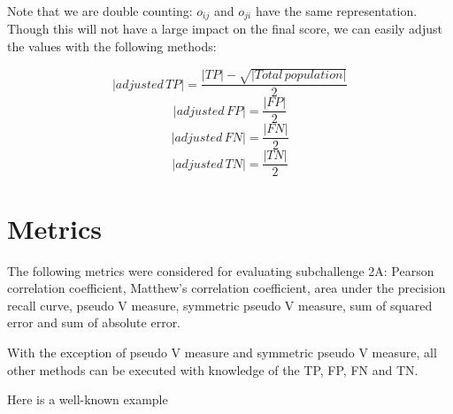 \documentclass[a4paper, 11pt]{article}
\begin{document}
Note that we are double counting: $o_{ij}$ and $o_{ji}$ have the same representation. Though this will not have a large impact on the final score, we can easily adjust the values with the following methods:

$$|adjusted\, TP| = \frac{|TP| - \sqrt{|Total\, population|}}{2} $$
$$|adjusted\, FP| = \frac{|FP|}{2}$$
$$|adjusted\, FN| = \frac{|FN|}{2}$$
$$|adjusted\, TN| = \frac{|TN|}{2}$$


\section*{Metrics}
The following metrics were considered for evaluating subchallenge 2A: Pearson correlation coefficient, Matthew's correlation coefficient, area under the precision recall curve, pseudo V measure, symmetric pseudo V measure, sum of squared error and sum of absolute error.

With the exception of pseudo V measure and symmetric pseudo V measure, all other methods can be executed with knowledge of the TP, FP, FN and TN. 

Here is a well-known example
\end{document}
